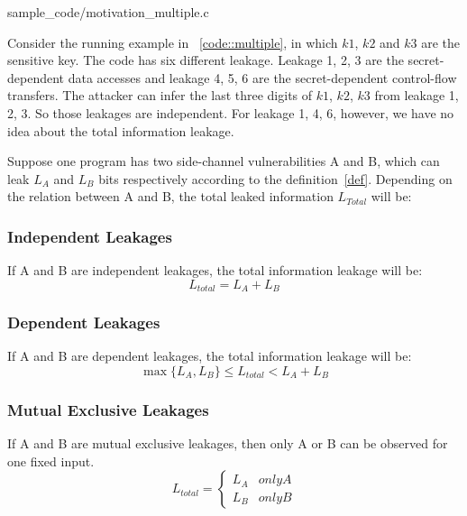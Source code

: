 
                 {sample_code/motivation_multiple.c}

                

Consider the running example in ~\ref{code::multiple}, in which $k1$, $k2$ and $k3$ are
the sensitive key. The code has six different leakage. Leakage 1, 2, 3 are the secret-dependent
data accesses and leakage 4, 5, 6 are the secret-dependent control-flow transfers.  
The attacker can infer the last three digits of
$k1$, $k2$, $k3$ from leakage 1, 2, 3. So those leakages are independent. For leakage 1, 4, 6, however,
we have no idea about the total information leakage.


Suppose one program has two side-channel vulnerabilities A and B, which can leak $L_A$ and $L_B$ bits respectively
according to the definition~\ref{def}. 
Depending on the relation between A and B, the total leaked information $L_{Total}$ will be:

\subsubsection{Independent Leakages}
If A and B are independent leakages, the total information leakage will be:
$$L_{total} = L_A + L_B $$

\subsubsection{Dependent Leakages}
If A and B are dependent leakages, the total information leakage will be:
$$\max{\{L_A, L_B\}}  \leq L_{total} < L_A + L_B$$

\subsubsection{Mutual Exclusive Leakages}
If A and B are mutual exclusive leakages, then only A or B can be observed for one fixed input.
$$L_{total} = 
\begin{cases}
L_A & only A \\
L_B & only B
\end{cases}$$

